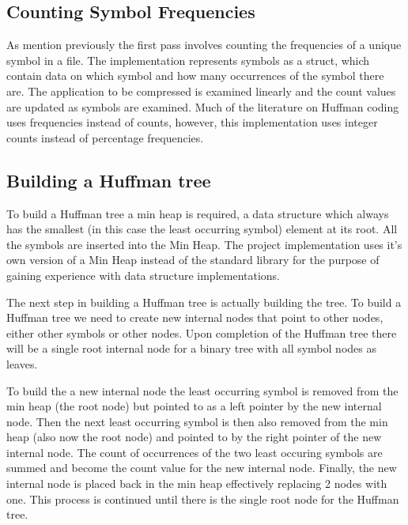 \subsection{Counting Symbol Frequencies}


\singlespacing
As mention previously the first pass involves counting the frequencies of a unique symbol in a file. The implementation represents symbols as a struct, which contain data on which symbol and how many occurrences of the symbol there are. The application to be compressed is examined linearly and the count values are updated as symbols are examined. Much of the literature on Huffman coding uses frequencies instead of counts, however, this implementation uses integer counts instead of percentage frequencies.


\subsection{Building a Huffman tree}


\doublespacing
\singlespacing
To build a Huffman tree a min heap is required, a  data structure which always has the smallest (in this case the least occurring symbol) element at its root. All the symbols are inserted into the Min Heap. The project implementation uses it's own version of a Min Heap instead of the standard library for the purpose of gaining experience with data structure implementations.


\doublespacing
\singlespacing
The next step in building a Huffman tree is actually building the tree. To build a Huffman tree we need to create new internal nodes that point to other nodes, either other symbols or other nodes. Upon completion of the Huffman tree there will be a single root internal node for a binary tree with all symbol nodes as leaves.


\doublespacing
\singlespacing
To build the a new internal node the least occurring symbol is removed from the min heap (the root node) but pointed to as a left pointer by the new internal node. Then the next least occurring symbol is then also removed from the min heap (also now the root node) and pointed to by the right pointer of the new internal node. The count of occurrences of the two least occuring symbols are summed and become the count value for the new internal node. Finally, the new internal node is placed back in the min heap effectively replacing 2 nodes with one. This process is continued until there is the single root node for the Huffman tree.


